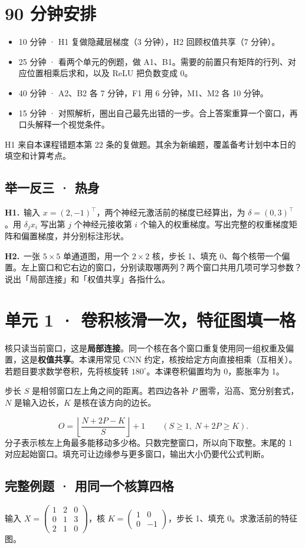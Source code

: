 \documentclass[UTF8,a4paper,11pt]{ctexart}
\newcommand{\PracticeQuestion}[3]{\par\Needspace{4\baselineskip}\noindent\begin{minipage}{\linewidth}\textbf{#1.}\ #2\par\noindent\rule{0pt}{#3mm}\par\end{minipage}\par}
\begin{document}
\section{90 分钟安排}
\begin{itemize}
\item 10 分钟 · H1 复做隐藏层梯度（3 分钟），H2 回顾权值共享（7 分钟）。
\item 25 分钟 · 看两个单元的例题，做 A1、B1。需要的前置只有矩阵的行列、对应位置相乘后求和，以及 ReLU 把负数变成 0。
\item 40 分钟 · A2、B2 各 7 分钟，F1 用 6 分钟，M1、M2 各 10 分钟。
\item 15 分钟 · 对照解析，圈出自己最先出错的一步。合上答案重算一个窗口，再口头解释一个视觉条件。
\end{itemize}
H1 来自本课程错题本第 22 条的复做题。其余为新编题，覆盖备考计划中本日的填空和计算考点。

\subsection{举一反三 · 热身}
\PracticeQuestion{H1}{输入 $x=(2,-1)^\top$，两个神经元激活前的梯度已经算出，为 $\delta=(0,3)^\top$。用 $\delta_j x_i$ 写出第 $j$ 个神经元接收第 $i$ 个输入的权重梯度。写出完整的权重梯度矩阵和偏置梯度，并分别标注形状。}{35}
\PracticeQuestion{H2}{一张 $5\times5$ 单通道图，用一个 $2\times2$ 核，步长 1、填充 0、每个核带一个偏置。左上窗口和它右边的窗口，分别读取哪两列？两个窗口共用几项可学习参数？说出「局部连接」和「权值共享」各指什么。}{35}
\clearpage
\section{单元 1 · 卷积核滑一次，特征图填一格}
核只读当前窗口，这是\textbf{局部连接}。同一个核在各个窗口重复使用同一组权重及偏置，这是\textbf{权值共享}。本课用常见 CNN 约定，核按给定方向直接相乘（互相关）。若题目要求数学卷积，先将核旋转 $180^\circ$。本课卷积偏置均为 0，膨胀率为 1。

步长 $S$ 是相邻窗口左上角之间的距离。若四边各补 $P$ 圈零，沿高、宽分别套式，$N$ 是输入边长，$K$ 是核在该方向的边长。

\[O=\left\lfloor\frac{N+2P-K}{S}\right\rfloor+1\qquad(S\ge1,\ N+2P\ge K).\]
分子表示核左上角最多能移动多少格。只数完整窗口，所以向下取整。末尾的 1 对应起始窗口。填充可让边缘参与更多窗口，输出大小仍要代公式判断。

\subsection{完整例题 · 用同一个核算四格}
输入 $X=\begin{pmatrix}1&2&0\\0&1&3\\2&1&0\end{pmatrix}$，核 $K=\begin{pmatrix}1&0\\0&-1\end{pmatrix}$，步长 1、填充 0。求激活前的特征图。
\end{document}
